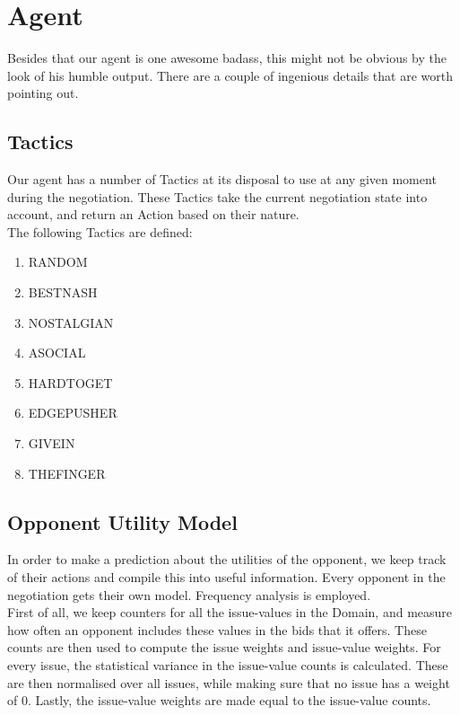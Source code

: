\section{Agent}
Besides that our agent is one awesome badass, this might not be obvious by the look of his humble output. There are a couple of ingenious details that are worth pointing out.

\subsection{Tactics}
Our agent has a number of Tactics at its disposal to use at any given moment during the negotiation. These Tactics take the current negotiation state into account, and return an Action based on their nature. \\

\noindent The following Tactics are defined:
\begin{enumerate}
\item RANDOM
\item BESTNASH
\item NOSTALGIAN
\item ASOCIAL
\item HARDTOGET
\item EDGEPUSHER
\item GIVEIN
\item THEFINGER
\end{enumerate}

\subsection{Opponent Utility Model}
\label{sec:opponentutilitymodel}
In order to make a prediction about the utilities of the opponent, we keep track of their actions and compile this into useful information. Every opponent in the negotiation gets their own model. Frequency analysis is employed.\\

First of all, we keep counters for all the issue-values in the Domain, and measure how often an opponent includes these values in the bids that it offers. These counts are then used to compute the issue weights and issue-value weights. For every issue, the statistical variance in the issue-value counts is calculated. These are then normalised over all issues, while making sure that no issue has a weight of 0. Lastly, the issue-value weights are made equal to the issue-value counts.

